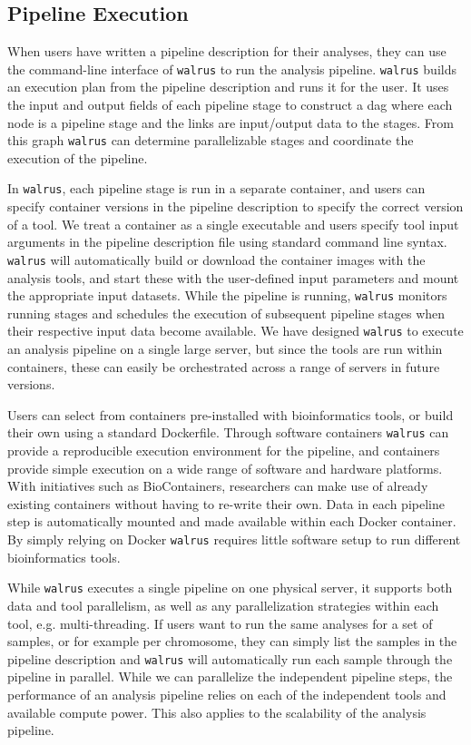\subsection{Pipeline Execution}
When users have written a pipeline description for their analyses, they can use
the command-line interface of \texttt{walrus} to run the analysis pipeline.
\texttt{walrus} builds an execution plan from the pipeline description and runs
it for the user. It uses the input and output fields of each pipeline stage to
construct a \gls{dag} where each node is a pipeline stage and the links are
input/output data to the stages. From this graph \texttt{walrus} can determine
parallelizable stages and coordinate the execution of the pipeline. 

In \texttt{walrus}, each pipeline stage is run in a separate container, and
users can specify container versions in the pipeline description to specify the
correct version of a tool. We treat a container as a single executable and users
specify tool input arguments in the pipeline description file using standard
command line syntax. \texttt{walrus} will automatically build or download the
container images with the analysis tools, and start these with the user-defined
input parameters and mount the appropriate input datasets. While the pipeline is
running, \texttt{walrus} monitors running stages and schedules the execution of
subsequent pipeline stages when their respective input data become available. We
have designed \texttt{walrus} to execute an analysis pipeline on a single large
server, but since the tools are run within containers, these can easily be
orchestrated across a range of servers in future versions. 

Users can select from containers pre-installed with bioinformatics tools, or build
their own using a standard Dockerfile. Through software containers
\texttt{walrus} can provide a reproducible execution environment for the
pipeline, and containers provide simple execution on a wide range of software
and hardware platforms.  With initiatives such as
BioContainers, researchers can make use of already existing
containers without having to re-write their own. Data in each pipeline step is
automatically mounted and made available within each Docker container. By simply
relying on Docker \texttt{walrus} requires little software setup to run
different bioinformatics tools. 

While \texttt{walrus} executes a single pipeline on one physical server, it
supports both data and tool parallelism, as well as any parallelization
strategies within each tool, e.g. multi-threading. If users want to run the same
analyses for a set of samples, or for example per chromosome, they can simply
list the samples in the pipeline description and \texttt{walrus} will
automatically run each sample through the pipeline in parallel. While we can
parallelize the independent pipeline steps, the performance of an analysis
pipeline relies on each of the independent tools and available compute power.
This also applies to the scalability of the analysis pipeline. 

